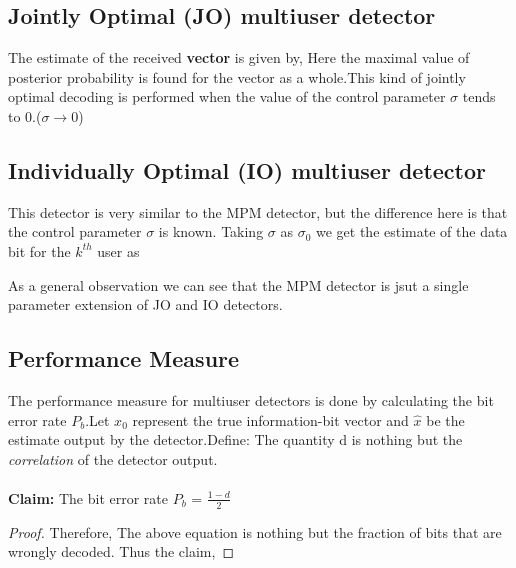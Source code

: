 \documentclass[letterpaper,english,10pt]{article}
\begin{document}
\subsection{Jointly Optimal (JO) multiuser detector}

The estimate of the received \textbf{vector} is given by,
Here the maximal value of posterior probability is found for the vector as a whole.This kind of jointly optimal decoding is performed when the value of the control parameter $\sigma$ tends to 0.($\sigma \to 0$)

\subsection{Individually Optimal (IO) multiuser detector}
This detector is very similar to the MPM detector, but the difference here is that the control parameter $\sigma$ is known. Taking $\sigma$ as $\sigma_0$ we get the estimate of the data bit for the $k^{th}$ user as 

As a general observation we can see that the MPM detector is jsut a single parameter extension of JO and IO detectors. 
\subsection{Performance Measure}
The performance measure for multiuser detectors is done by calculating the bit error rate $P_b$.Let $x_0$ represent the true information-bit vector and $\hat{x}$ be the estimate output by the detector.Define:
The quantity d is nothing but the \textit{correlation} of the detector output.\\\\
\textbf{Claim: } The bit error rate $P_b$ = $\frac{1-d}{2}$
 \begin{proof}
Therefore,
The above equation is nothing but the fraction of bits that are wrongly decoded. Thus the claim,
\end{proof}
\end{document}
